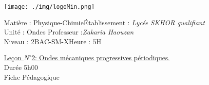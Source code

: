\documentclass[12pt]{article}
\newcommand\headerMe[2]{\noindent{}#1\hfill#2}
\begin{document}
\begin{center}
\texttt{[image: ./img/logoMin.png]}
\vspace{-3cm}
\end{center}
\headerMe{Matière : Physique-Chimie}{Établissement : \emph{Lycée SKHOR qualifiant}}\\
\headerMe{ Unité : Ondes }{  Professeur :\emph{Zakaria Haouzan}}\\
\headerMe{Niveau : 2BAC-SM-X}{Heure : 5H}\\

\begin{center}
	\underline{Leçon $N^{\circ}$2: Ondes mécaniques progressives périodiques. }\\
Durée 5h00
\\
    \vspace{.2cm}
\hrulefill
\Large{Fiche Pédagogique}
\hrulefill\\
\end{center}
\end{document}
